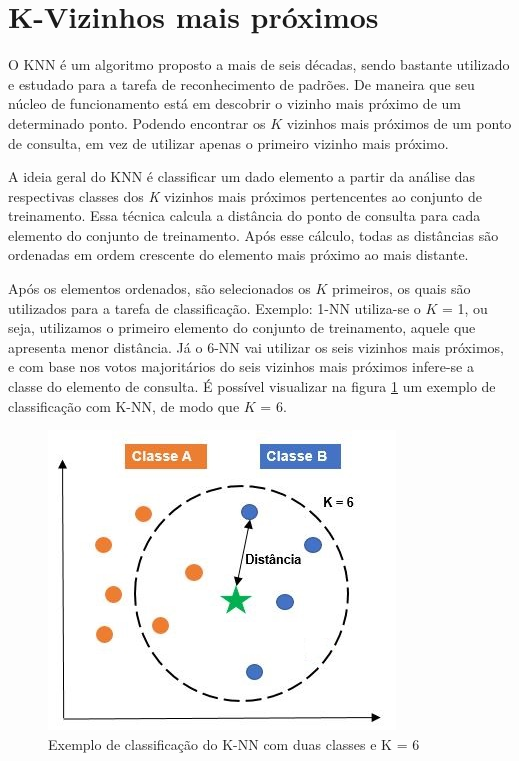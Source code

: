 \section{K-Vizinhos mais próximos}


O KNN é um algoritmo proposto a mais de seis décadas, sendo bastante utilizado e estudado para a tarefa de reconhecimento de padrões. De maneira que seu núcleo de funcionamento está em descobrir o vizinho mais próximo de um determinado ponto. Podendo encontrar os $K$ vizinhos mais próximos de um ponto de consulta, em vez de utilizar apenas o primeiro vizinho mais próximo.

A ideia geral do KNN é classificar um dado elemento a partir da análise das respectivas classes dos \textit{K} vizinhos mais próximos pertencentes ao conjunto de treinamento. Essa técnica calcula a distância do ponto de consulta para  cada elemento do conjunto de treinamento. Após esse cálculo, todas as distâncias são ordenadas em ordem crescente do elemento mais próximo ao mais distante.

Após os elementos ordenados, são selecionados os $K$ primeiros, os quais são utilizados para a tarefa de classificação. Exemplo: 1-NN utiliza-se o $K$ = 1, ou seja, utilizamos o primeiro elemento do conjunto de treinamento, aquele que apresenta menor distância. Já o 6-NN vai utilizar os seis vizinhos mais próximos, e com  base nos votos majoritários do seis vizinhos mais próximos infere-se a classe do elemento de consulta. É possível visualizar na figura \ref{fig:knn} um exemplo de classificação com K-NN, de modo que $K$ = 6.

\begin{figure}[ht]
\centering
\caption{Exemplo de classificação do K-NN com duas classes e K = 6}
\includegraphics[scale=0.9]{imgs2/knn.png}

\label{fig:knn}
\end{figure}


